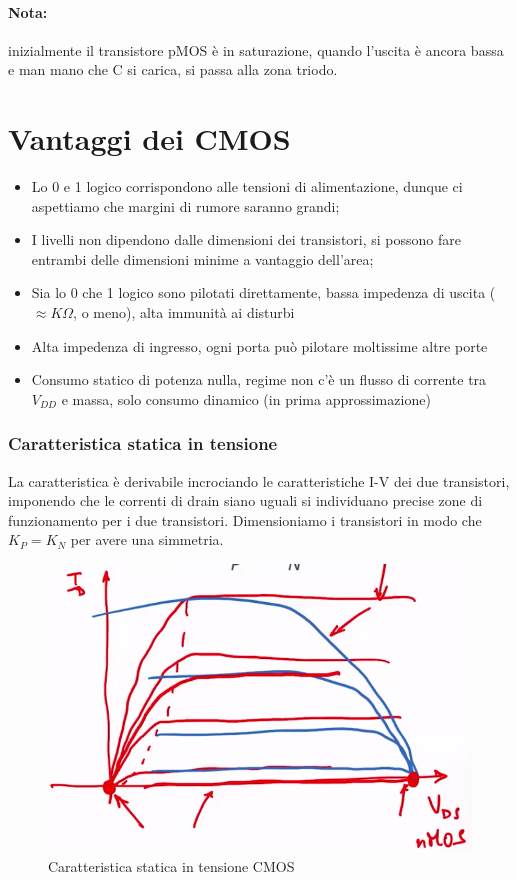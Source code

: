 \paragraph{Nota:}	inizialmente il transistore pMOS è in	saturazione,	quando l'uscita è ancora bassa e man	mano che C	si carica, si passa alla zona triodo.

\newpage
\section{Vantaggi dei CMOS}

\begin{itemize}
    \item Lo	0	e	1	logico corrispondono alle tensioni di	alimentazione, dunque ci aspettiamo che margini di	rumore saranno grandi;
    \item I	livelli non	dipendono dalle dimensioni dei transistori, si	possono fare	entrambi delle dimensioni minime a	vantaggio dell'area;
    \item Sia lo	0	che 1	logico sono pilotati direttamente, bassa impedenza di	uscita ($\approx K\Omega$, o meno),	alta immunità ai disturbi
    \item Alta	impedenza di	ingresso, ogni porta	può pilotare moltissime altre porte
    \item Consumo statico di	potenza nulla, regime	non	c'è un	flusso di	corrente tra $V_{DD}$ e	massa, solo	consumo dinamico (in	prima	approssimazione)
\end{itemize}

\subsubsection{Caratteristica statica in tensione}

La caratteristica è derivabile incrociando le caratteristiche I-V dei due transistori, imponendo che le correnti di drain siano uguali si individuano precise	zone	di	funzionamento per	i due	 transistori. Dimensioniamo i transistori in	modo che $K_P =	K_N$ per avere una simmetria.


\begin{figure}[htbp]
    \centering
    \includegraphics[width=0.44\linewidth]{img/caratt_cmos.png}
    \caption{Caratteristica statica in tensione CMOS}    
\end{figure}

